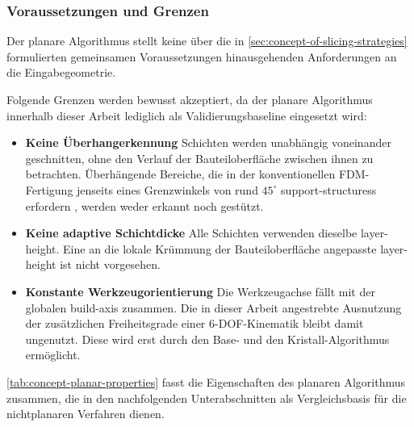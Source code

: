             \subsubsection{Voraussetzungen und Grenzen}\label{subsubsec:concept-planar-assumptions-limits}
                Der planare Algorithmus stellt keine über die in \cref{sec:concept-of-slicing-strategies} formulierten gemeinsamen Voraussetzungen hinausgehenden Anforderungen an die Eingabegeometrie.

                Folgende Grenzen werden bewusst akzeptiert, da der planare Algorithmus innerhalb dieser Arbeit lediglich als Validierungsbaseline eingesetzt wird:
                \begin{itemize}
                    \item \textbf{Keine Überhangerkennung}
                        Schichten werden unabhängig voneinander geschnitten, ohne den Verlauf der Bauteiloberfläche zwischen ihnen zu betrachten.
                        Überhängende Bereiche, die in der konventionellen \ac{FDM}-Fertigung jenseits eines Grenzwinkels von rund $45^\circ$ \glspl{support-structures} erfordern \autocite[vgl.][S.~120]{vanekCleverSupportEfficient2014}, werden weder erkannt noch gestützt.
                    \item \textbf{Keine adaptive Schichtdicke}
                        Alle Schichten verwenden dieselbe \gls{layer-height}.
                        Eine an die lokale Krümmung der Bauteiloberfläche angepasste \gls{layer-height} ist nicht vorgesehen.
                    \item \textbf{Konstante Werkzeugorientierung}
                        Die Werkzeugachse fällt mit der globalen \gls{build-axis} zusammen.
                        Die in dieser Arbeit angestrebte Ausnutzung der zusätzlichen Freiheitsgrade einer 6-\ac{DOF}-Kinematik bleibt damit ungenutzt.
                        Diese wird erst durch den Base- und den Kristall-Algorithmus ermöglicht.
                \end{itemize}

                \cref{tab:concept-planar-properties} fasst die Eigenschaften des planaren Algorithmus zusammen, die in den nachfolgenden Unterabschnitten als Vergleichsbasis für die nichtplanaren Verfahren dienen.

